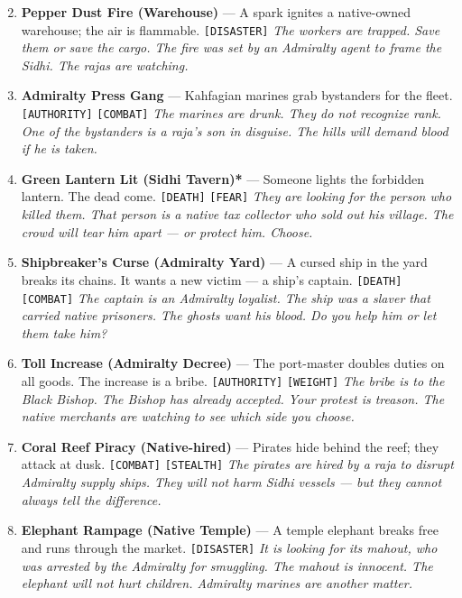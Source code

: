 \begin{enumerate}
\setcounter{enumi}{1}
\item \textbf{Pepper Dust Fire (Warehouse)\textdagger} --- A spark ignites a native-owned warehouse; the air is flammable. \texttt{[DISASTER]}
  \hfill \textit{The workers are trapped. Save them or save the cargo. The fire was set by an Admiralty agent to frame the Sidhi. The rajas are watching.}
\item \textbf{Admiralty Press Gang\textdaggerdbl} --- Kahfagian marines grab bystanders for the fleet. \texttt{[AUTHORITY]} \texttt{[COMBAT]}
  \hfill \textit{The marines are drunk. They do not recognize rank. One of the bystanders is a raja's son in disguise. The hills will demand blood if he is taken.}
\item \textbf{Green Lantern Lit (Sidhi Tavern)*} --- Someone lights the forbidden lantern. The dead come. \texttt{[DEATH]} \texttt{[FEAR]}
  \hfill \textit{They are looking for the person who killed them. That person is a native tax collector who sold out his village. The crowd will tear him apart --- or protect him. Choose.}
\item \textbf{Shipbreaker's Curse (Admiralty Yard)\textdaggerdbl} --- A cursed ship in the yard breaks its chains. It wants a new victim --- a ship's captain. \texttt{[DEATH]} \texttt{[COMBAT]}
  \hfill \textit{The captain is an Admiralty loyalist. The ship was a slaver that carried native prisoners. The ghosts want his blood. Do you help him or let them take him?}
\item \textbf{Toll Increase (Admiralty Decree)\textdaggerdbl} --- The port-master doubles duties on all goods. The increase is a bribe. \texttt{[AUTHORITY]} \texttt{[WEIGHT]}
  \hfill \textit{The bribe is to the Black Bishop. The Bishop has already accepted. Your protest is treason. The native merchants are watching to see which side you choose.}
\item \textbf{Coral Reef Piracy (Native-hired)\textdagger} --- Pirates hide behind the reef; they attack at dusk. \texttt{[COMBAT]} \texttt{[STEALTH]}
  \hfill \textit{The pirates are hired by a raja to disrupt Admiralty supply ships. They will not harm Sidhi vessels --- but they cannot always tell the difference.}
\item \textbf{Elephant Rampage (Native Temple)\textdagger} --- A temple elephant breaks free and runs through the market. \texttt{[DISASTER]}
  \hfill \textit{It is looking for its mahout, who was arrested by the Admiralty for smuggling. The mahout is innocent. The elephant will not hurt children. Admiralty marines are another matter.}

\end{enumerate}
